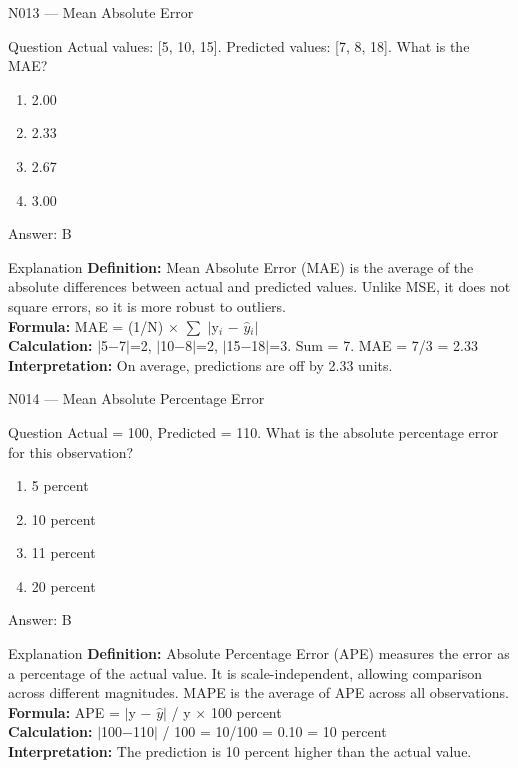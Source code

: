 \documentclass[aspectratio=169,8pt]{beamer}
\begin{document}
	\begin{frame}{N013 --- Mean Absolute Error}
		\begin{block}{Question}
			Actual values: [5, 10, 15]. Predicted values: [7, 8, 18]. What is the MAE?
			\begin{enumerate}
				\item 2.00
				\item 2.33
				\item 2.67
				\item 3.00
			\end{enumerate}
		\end{block}
		\begin{exampleblock}{Answer: B}\end{exampleblock}
		\begin{block}{Explanation}
			\textbf{Definition:} Mean Absolute Error (MAE) is the average of the absolute differences between actual and predicted values. Unlike MSE, it does not square errors, so it is more robust to outliers.\\
			\textbf{Formula:} MAE = (1/N) $\times$ $\sum$ $|$y$_{i}$ $-$ $\hat{y}$$_{i}$$|$\\
			\textbf{Calculation:} $|$5$-$7$|$=2, $|$10$-$8$|$=2, $|$15$-$18$|$=3. Sum = 7. MAE = 7/3 = 2.33\\
			\textbf{Interpretation:} On average, predictions are off by 2.33 units.
		\end{block}
	\end{frame}
	
	\begin{frame}{N014 --- Mean Absolute Percentage Error}
		\begin{block}{Question}
			Actual = 100, Predicted = 110. What is the absolute percentage error for this observation?
			\begin{enumerate}
				\item 5 percent
				\item 10 percent
				\item 11 percent
				\item 20 percent
			\end{enumerate}
		\end{block}
		\begin{exampleblock}{Answer: B}\end{exampleblock}
		\begin{block}{Explanation}
			\textbf{Definition:} Absolute Percentage Error (APE) measures the error as a percentage of the actual value. It is scale-independent, allowing comparison across different magnitudes. MAPE is the average of APE across all observations.\\
			\textbf{Formula:} APE = $|$y $-$ $\hat{y}$$|$ / y $\times$ 100 percent\\
			\textbf{Calculation:} $|$100$-$110$|$ / 100 = 10/100 = 0.10 = 10 percent\\
			\textbf{Interpretation:} The prediction is 10 percent higher than the actual value.
		\end{block}
	\end{frame}
	
\end{document}
